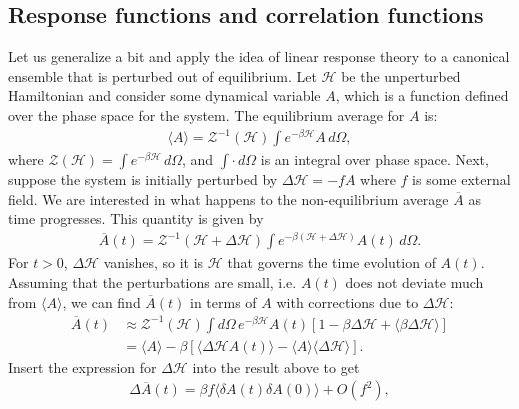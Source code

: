 \documentclass[reprint,
nofootinbib,
amsmath,amssymb,
aps]{revtex4-1}
\newcommand{\be}{\beta}
\newcommand{\f}[2]{\frac{#1}{#2}}
\newcommand{\lb}{\left[}
\newcommand{\rb}{\right]}
\begin{document}
\subsection{Response functions and correlation functions}
Let us generalize a bit and apply the idea of linear response theory to a canonical ensemble that is perturbed out of equilibrium. Let $\mathcal{H}$ be the unperturbed Hamiltonian and consider some dynamical variable $A$, which is a function defined over the phase space for the system. The equilibrium average for $A$ is:
\begin{align*}
\langle A \rangle =  \mathcal{Z}^{-1}(\mathcal{H}) \int e^{-\be \mathcal{H}} A\, d\Omega,
\end{align*}
where $\mathcal{Z}(\mathcal{H}) = \int e^{-\be \mathcal{H}} \, d\Omega$, and $\int \cdot \,d\Omega$ is an integral over phase space. Next, suppose the system is initially perturbed by $\Delta \mathcal{H} = -f A$ where $f$ is some external field. We are interested in what happens to the non-equilibrium average $\overline{A}$ as time progresses. This quantity is given by 
\begin{align*}
\overline{A}(t) = \mathcal{Z}^{-1}(\mathcal{H} + \Delta \mathcal{H})  \int e^{-\be(\mathcal{H} + \Delta \mathcal{H})} A(t) \, d\Omega. 
\end{align*}
For $t>0$, $\Delta \mathcal{H}$ vanishes, so it is $\mathcal{H}$ that governs the time evolution of $A(t)$. Assuming that the perturbations are small, i.e. $A(t)$ does not deviate much from $\langle A \rangle$, we can find $\overline{A}(t)$ in terms of $A$ with corrections due to $\Delta \mathcal{H}$:
\begin{align*}
\overline{A}(t) 
&\approx \mathcal{Z}^{-1}(\mathcal{H})  \int d\Omega \, e^{-\be \mathcal{H}} A(t)   \lb 1 - \be \Delta \mathcal{H}  + \langle  \be \Delta \mathcal{H}  \rangle  \rb \\ 
&= \langle A \rangle - \be \lb \langle \Delta \mathcal{H} A(t) \rangle - \langle A \rangle \langle \Delta \mathcal{H} \rangle  \rb.
\end{align*}
Insert the expression for $\Delta \mathcal{H}$ into the result above to get
\begin{align}
\label{eq:fluctuation}
\Delta \overline{A}(t) = \be f \langle \delta A(t) \delta A(0) \rangle + {O}(f^2),
\end{align}
\end{document}
